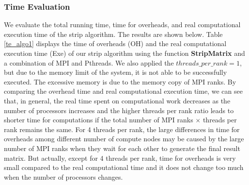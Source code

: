 \documentclass[conference]{IEEEtran}
\begin{document}
\subsubsection{Time Evaluation}
We evaluate the total running time, time for overheads, and real computational execution time of the strip algorithm. The results are shown below. Table \ref{te_algo1} displays the time of overheads (OH) and the real computational execution time (Exe) of our strip algorithm using the function \textbf{StripMatrix} and a combination of MPI and Pthreads. We also applied the $threads\_per\_rank = 1$, but due to the memory limit of the system, it is not able to be successfully executed. The excessive memory is due to the memory copy of MPI ranks. By comparing the overhead time and real computational execution time, we can see that, in general, the real time spent on computational work decreases as the number of processors increases and the higher threads per rank ratio leads to shorter time for computations if the total number of MPI ranks $\times$ threads per rank remains the same. For 4 threads per rank, the large differences in time for overheads among different number of compute nodes may be caused by the large number of MPI ranks when they wait for each other to generate the final result matrix. But actually, except for 4 threads per rank, time for overheads is very small compared to the real computational time and it does not change too much when the number of processors changes. 
\end{document}
